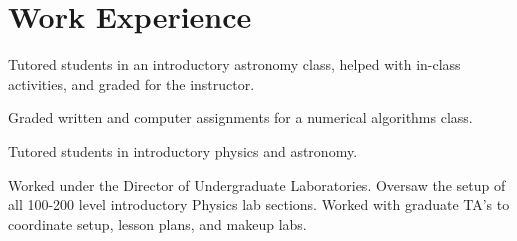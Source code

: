 \documentclass[letterpaper]{deedy-resume} %
\begin{document}
\section{Work Experience}


Tutored students in an introductory astronomy class, helped with in-class activities, and graded for the instructor.

\sectionspace %



Graded written and computer assignments for a numerical algorithms class.

\sectionspace %



Tutored students in introductory physics and astronomy.

\sectionspace %



Worked under the Director of Undergraduate Laboratories. Oversaw the setup of all 100-200 level introductory Physics lab sections. Worked with graduate TA’s to coordinate setup, lesson plans, and makeup labs.

\sectionspace %






%
%
\end{document}
